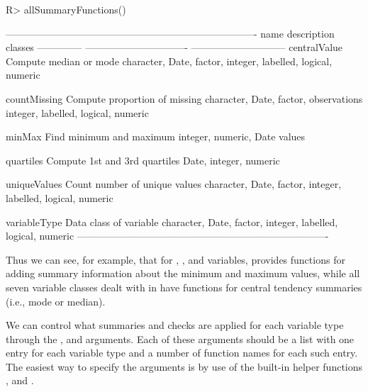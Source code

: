\documentclass[article,shortnames]{jss}
\begin{document}
\begin{Schunk}
\begin{Sinput}
R> allSummaryFunctions()
\end{Sinput}
\begin{Soutput}
----------------------------------------------------------------------------
name           description                     classes                      
-------------- ------------------------------- -----------------------------
centralValue   Compute median or mode          character, Date, factor,     
                                               integer, labelled, logical,  
                                               numeric                      

countMissing   Compute proportion of missing        character, Date, factor,     
               observations                    integer, labelled, logical,  
                                               numeric                      

minMax         Find minimum and maximum        integer, numeric, Date       
               values                                                       

quartiles      Compute 1st and 3rd quartiles   Date, integer, numeric       

uniqueValues   Count number of unique values   character, Date, factor,     
                                               integer, labelled, logical,  
                                               numeric                      

variableType   Data class of variable          character, Date, factor,     
                                               integer, labelled, logical,  
                                               numeric                      
----------------------------------------------------------------------------
\end{Soutput}
\end{Schunk}

Thus we can see, for example, that for , ,
and  variables,  provides functions for
adding summary information about the minimum and maximum values, while
all seven variable classes dealt with in  have functions
for central tendency summaries (i.e., mode or median).

We can control what summaries and checks are applied for each variable type
through the ,  and  arguments. Each of these arguments should be a list with one entry for each variable type and a number of function names for each such entry. The easiest way to specify the arguments is by use of the built-in helper functions ,  and . 
\end{document}
